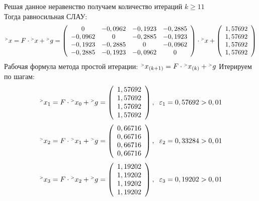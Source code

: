 \documentclass[12pt]{article}
\begin{document}
Решая данное неравенство получаем количество итераций $ k \geqslant 11 $ \\
Тогда равносильная СЛАУ:
\begin{equation*}
	{}^{\mathsmaller{>}} x = F \cdot {}^{\mathsmaller{>}} x + {}^{\mathsmaller{>}} g = \left(
	\begin{array}{cccc}
		0 & -0,0962 & -0,1923 & -0,2885 \\
		-0,0962 & 0 & -0,2885 & -0,1923 \\
		-0,1923 & -0,2885 & 0 & -0,0962 \\
		-0,2885 & -0,1923 & -0,0962 & 0 \\
	\end{array}
	\right) \cdot {}^{\mathsmaller{>}} x + \left(
	\begin{array}{c}
		1,57692 \\ 1,57692 \\ 1,57692 \\ 1,57692 \\ 
	\end{array}\right)
\end{equation*}
Рабочая формула метода простой итерации: $  {}^{\mathsmaller{>}} x_{(k+1)}= F \cdot 
 {}^{\mathsmaller{>}} x_{(k)} +  {}^{\mathsmaller{>}} g $
Итерируем по шагам:
\begin{equation*}
	{}^{\mathsmaller{>}} x_{1}= F \cdot 
	{}^{\mathsmaller{>}} x_{0} +  {}^{\mathsmaller{>}} g = 
	\left(
	\begin{array}{c}
		1,57692 \\ 1,57692 \\ 1,57692 \\ 1,57692 \\
	\end{array}
	\right), \hspace{0.2cm}
	\varepsilon_1 = 0,57692 > 0,01
\end{equation*}
\begin{equation*}
	{}^{\mathsmaller{>}} x_{2}= F \cdot 
	{}^{\mathsmaller{>}} x_{1} +  {}^{\mathsmaller{>}} g = 
	\left(
	\begin{array}{c}
		0,66716 \\ 0,66716 \\ 0,66716 \\ 0,66716 \\ 
	\end{array}
	\right), \hspace{0.2cm}
	\varepsilon_2 = 0,33284 > 0,01
\end{equation*}
\begin{equation*}
	{}^{\mathsmaller{>}} x_{3}= F \cdot 
	{}^{\mathsmaller{>}} x_{2} +  {}^{\mathsmaller{>}} g = 
	\left(
	\begin{array}{c}
		1,19202 \\ 1,19202 \\ 1,19202 \\ 1,19202 \\ 
	\end{array}
	\right), \hspace{0.2cm}
	\varepsilon_3 = 0,19202 > 0,01
\end{equation*}
\end{document}
